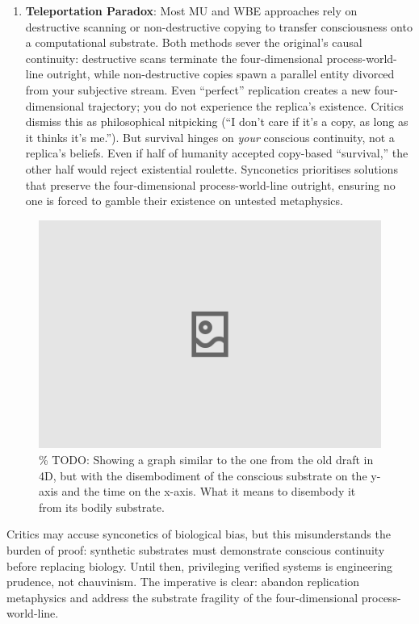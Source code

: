 \documentclass[10pt]{article}
\begin{document}
\begin{sloppypar}
\begin{enumerate}
    \item \textbf{Teleportation Paradox}: Most MU and WBE approaches rely on destructive scanning or non-destructive copying to transfer consciousness onto a computational substrate. Both methods sever the original’s causal continuity: destructive scans terminate the four-dimensional process-world-line outright, while non-destructive copies spawn a parallel entity divorced from your subjective stream. Even “perfect” replication creates a new four-dimensional trajectory; you do not experience the replica’s existence. Critics dismiss this as philosophical nitpicking (“I don’t care if it’s a copy, as long as it thinks it’s me.”). But survival hinges on \emph{your} conscious continuity, not a replica’s beliefs. Even if half of humanity accepted copy-based “survival,” the other half would reject existential roulette. Synconetics prioritises solutions that preserve the four-dimensional process-world-line outright, ensuring no one is forced to gamble their existence on untested metaphysics.
  \end{enumerate}

  \begin{figure}[ht!]
    \centering
    \includegraphics[width=\textwidth]{figures/4d-trajectory-disembodiment.png}
    \caption{\% TODO: Showing a graph similar to the one from the old draft in 4D, but with the disembodiment of the conscious substrate on the y-axis and the time on the x-axis. What it means to disembody it from its bodily substrate.}
    \label{fig:4d-trajectory-disembodiment}
  \end{figure}

  Critics may accuse synconetics of biological bias, but this misunderstands the burden of proof: synthetic substrates must demonstrate conscious continuity before replacing biology. Until then, privileging verified systems is engineering prudence, not chauvinism. The imperative is clear: abandon replication metaphysics and address the substrate fragility of the four-dimensional process-world-line.


\end{sloppypar}
\end{document}
